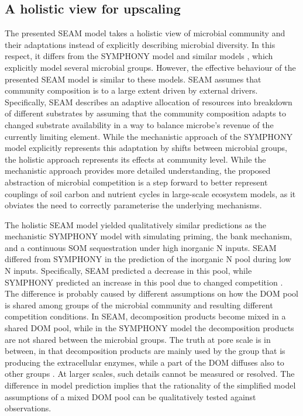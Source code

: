 \subsection{A holistic view for upscaling}
\label{sec:Holistic}

The presented SEAM model takes a holistic view \citep{Panikov10} of microbial
community and their adaptations instead of explicitly describing microbial
diversity.
In this respect, it differs from the SYMPHONY model \citep{Perveen14} and
similar models \citep{Fontaine03}, which explicitly model several microbial
groups.
However, the effective behaviour of the presented SEAM model is similar to these
models.
SEAM assumes that community composition is to a large extent driven by external
drivers. Specifically, SEAM describes an adaptive allocation of resources into
breakdown of different substrates by assuming that the community composition
adapts to changed substrate availability in a way to balance microbe's
revenue of the currently limiting element.
While the mechanistic approach of the SYMPHONY model explicitly represents this
adaptation by shifts between microbial groups, the holistic approach represents
its effects at community level. While the mechanistic approach provides more
detailed understanding, the proposed abstraction of microbial competition is a
step forward to better represent couplings of soil carbon and nutrient cycles in
large-scale ecosystem models, as it obviates the need to correctly parameterise
the underlying mechanisms.

The holistic SEAM model yielded qualitatively similar predictions as the
mechanistic SYMPHONY model with simulating priming, the bank mechanism, and a
continuous SOM sequestration under high inorganic N inputs. SEAM differed from
SYMPHONY in the prediction of the inorganic N pool during low N inputs.
Specifically, SEAM predicted a decrease in this pool, while SYMPHONY predicted an
increase in this pool due to changed competition \citep{Perveen14}. The
difference is probably caused by different assumptions on how the DOM pool is
shared among groups of the microbial community and resulting different
competition conditions. In SEAM, decomposition products become mixed
in a shared DOM pool, while in the SYMPHONY model the decomposition products are
not shared between the microbial groups.
The truth at pore scale is in between, in that decomposition products are mainly
used by the group that is producing the extracellular enzymes, while a part of
the DOM diffuses also to other groups \citep{Kaiser14}. At larger scales, such
details cannot be measured or resolved. The difference in model prediction
implies that the rationality of the simplified model assumptions of a mixed
DOM pool can be qualitatively tested against observations. 

